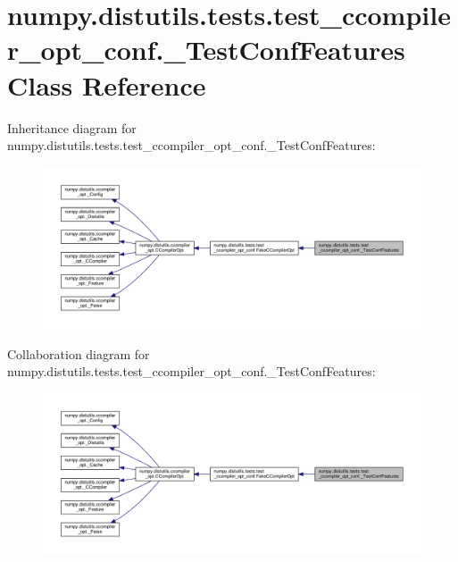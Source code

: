 \hypertarget{classnumpy_1_1distutils_1_1tests_1_1test__ccompiler__opt__conf_1_1__TestConfFeatures}{}\section{numpy.\+distutils.\+tests.\+test\+\_\+ccompiler\+\_\+opt\+\_\+conf.\+\_\+\+Test\+Conf\+Features Class Reference}
\label{classnumpy_1_1distutils_1_1tests_1_1test__ccompiler__opt__conf_1_1__TestConfFeatures}


Inheritance diagram for numpy.\+distutils.\+tests.\+test\+\_\+ccompiler\+\_\+opt\+\_\+conf.\+\_\+\+Test\+Conf\+Features\+:
\nopagebreak
\begin{figure}[H]
\begin{center}
\leavevmode
\includegraphics[width=350pt]{classnumpy_1_1distutils_1_1tests_1_1test__ccompiler__opt__conf_1_1__TestConfFeatures__inherit__graph}
\end{center}
\end{figure}


Collaboration diagram for numpy.\+distutils.\+tests.\+test\+\_\+ccompiler\+\_\+opt\+\_\+conf.\+\_\+\+Test\+Conf\+Features\+:
\nopagebreak
\begin{figure}[H]
\begin{center}
\leavevmode
\includegraphics[width=350pt]{classnumpy_1_1distutils_1_1tests_1_1test__ccompiler__opt__conf_1_1__TestConfFeatures__coll__graph}
\end{center}
\end{figure}
